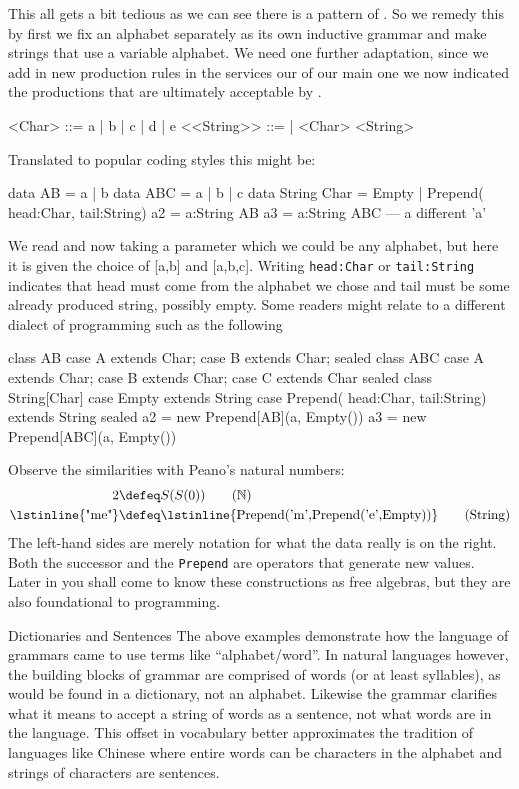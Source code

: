 This all gets a bit tedious as we can see there is a pattern of
.  So we remedy this by first we fix an alphabet
separately as its own inductive grammar and make strings that use a variable alphabet.
We need one further adaptation, since we add in new production rules in 
the services our of our main one we now indicated the productions 
that are ultimately acceptable by .
\begin{Gcode}[]
<Char> ::= a | b | c | d | e
<<String>> ::= 
           | <Char> <String>
\end{Gcode}
Translated to popular coding styles this might be:
\begin{Fcode}[]
data AB = a | b
data ABC = a | b | c 
data String Char = Empty 
            | Prepend( head:Char, tail:String) 
a2 = a:String AB
a3 = a:String ABC --- a different 'a'
\end{Fcode}
We read  and now taking a parameter 
which we could be any alphabet, but here it is given the 
choice of [a,b] and [a,b,c].
Writing \lstinline{head:Char} or \lstinline{tail:String} 
indicates that head must come from the alphabet we chose 
and tail must be some already produced string, possibly empty.
Some readers might relate to a different dialect of 
programming such as the following
\begin{Pcode}[]
class AB
  case A extends Char;  case B extends Char;
sealed
class ABC
  case A extends Char;  case B extends Char;
  case C extends Char
sealed
class String[Char]
  case Empty extends String
  case Prepend( head:Char, tail:String) extends String
sealed
a2 = new Prepend[AB](a, Empty())
a3 = new Prepend[ABC](a, Empty())
\end{Pcode}
Observe the similarities with Peano's natural numbers:
\begin{align}
     2 & \defeq S(S(0)) \tag{$\mathbb{N}$}\\
 \text{\lstinline{"me"}} & \defeq \text{\lstinline{Prepend('m',Prepend('e',Empty))}}
\tag{String}
\end{align}
The left-hand sides are merely notation for what the data really is on the right.
Both the successor and the \lstinline{Prepend} are operators that generate 
new values.  Later in you shall come to know these constructions as free algebras,
but they are also foundational to programming.



\begin{remark}{Dictionaries and Sentences}
    The above examples demonstrate how the language of grammars came to 
    use terms like ``alphabet/word''. 
    In natural languages however, the building blocks of grammar are comprised of words (or
    at least syllables), as would be found in a dictionary, not an alphabet.  
    Likewise the grammar clarifies what it means to accept a string of words as a sentence,
    not what words are in the language. This offset in vocabulary better 
    approximates the tradition of languages like Chinese
    where entire words can be characters in the alphabet and strings of
    characters are sentences.
\end{remark}
